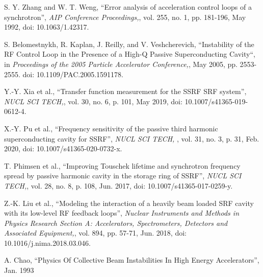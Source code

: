 \documentclass[letterpaper,
               nospread,     %
               ]{jacow}
\begin{document}
{\begin{thebibliography}{99}
      S. Y. Zhang and W. T. Weng, “Error analysis of acceleration control loops of a synchrotron”,
      \textit{AIP Conference Proceedings,},
      vol. 255, no. 1, pp. 181-196, May 1992, doi: 10.1063/1.42317.

      S. Belomestnykh, R. Kaplan, J. Reilly, and V. Veshcherevich, “Instability of the RF Control Loop in the Presence of a High-Q Passive Superconducting Cavity“, in
      \textit{Proceedings of the 2005 Particle Accelerator Conference,},
      May 2005, pp. 2553-2555. doi: 10.1109/PAC.2005.1591178.

      Y.-Y. Xia et al., “Transfer function measurement for the SSRF SRF system”,
      \textit{NUCL SCI TECH,},
      vol. 30, no. 6, p. 101, May 2019, doi: 10.1007/s41365-019-0612-4.

      X.-Y. Pu et al., “Frequency sensitivity of the passive third harmonic superconducting cavity for SSRF”,
      \textit{NUCL SCI TECH, },
      vol. 31, no. 3, p. 31, Feb. 2020, doi: 10.1007/s41365-020-0732-x.

      T. Phimsen et al., “Improving Touschek lifetime and synchrotron frequency spread by passive harmonic cavity in the storage ring of SSRF”,
      \textit{NUCL SCI TECH,},
      vol. 28, no. 8, p. 108, Jun. 2017, doi: 10.1007/s41365-017-0259-y.

      Z.-K. Liu et al., “Modeling the interaction of a heavily beam loaded SRF cavity with its low-level RF feedback loops”,
      \textit{Nuclear Instruments and Methods in Physics Research Section A: Accelerators, Spectrometers, Detectors and Associated Equipment,},
      vol. 894, pp. 57-71, Jun. 2018, doi: 10.1016/j.nima.2018.03.046.

      A. Chao, “Physics Of Collective Beam Instabilities In High Energy Accelerators”, Jan. 1993

   \end{thebibliography}
} %
%
% 

\end{document}
